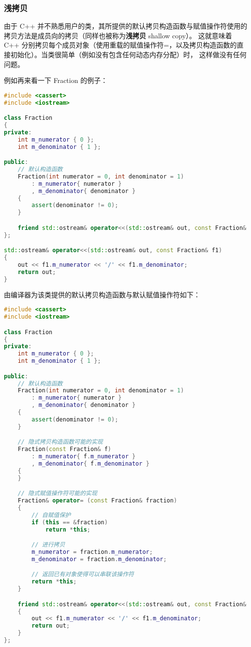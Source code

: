 \documentclass[../../LearnCpp.tex]{subfiles}
\begin{document}

\subsubsection*{浅拷贝}

由于 C++ 并不熟悉用户的类，其所提供的默认拷贝构造函数与赋值操作符使用的拷贝方法是成员向的拷贝（同样也被称为\textbf{浅拷贝} shallow copy）。
这就意味着 C++ 分别拷贝每个成员对象（使用重载的赋值操作符=，以及拷贝构造函数的直接初始化）。当类很简单（例如没有包含任何动态内存分配）时，
这样做没有任何问题。

例如再来看一下 Fraction 的例子：

\begin{lstlisting}[language=C++]
#include <cassert>
#include <iostream>

class Fraction
{
private:
    int m_numerator { 0 };
    int m_denominator { 1 };

public:
    // 默认构造函数
    Fraction(int numerator = 0, int denominator = 1)
        : m_numerator{ numerator }
        , m_denominator{ denominator }
    {
        assert(denominator != 0);
    }

    friend std::ostream& operator<<(std::ostream& out, const Fraction& f1);
};

std::ostream& operator<<(std::ostream& out, const Fraction& f1)
{
	out << f1.m_numerator << '/' << f1.m_denominator;
	return out;
}
\end{lstlisting}

由编译器为该类提供的默认拷贝构造函数与默认赋值操作符如下：

\begin{lstlisting}[language=C++]
#include <cassert>
#include <iostream>

class Fraction
{
private:
    int m_numerator { 0 };
    int m_denominator { 1 };

public:
    // 默认构造函数
    Fraction(int numerator = 0, int denominator = 1)
        : m_numerator{ numerator }
        , m_denominator{ denominator }
    {
        assert(denominator != 0);
    }

    // 隐式拷贝构造函数可能的实现
    Fraction(const Fraction& f)
        : m_numerator{ f.m_numerator }
        , m_denominator{ f.m_denominator }
    {
    }

    // 隐式赋值操作符可能的实现
    Fraction& operator= (const Fraction& fraction)
    {
        // 自赋值保护
        if (this == &fraction)
            return *this;

        // 进行拷贝
        m_numerator = fraction.m_numerator;
        m_denominator = fraction.m_denominator;

        // 返回已有对象使得可以串联该操作符
        return *this;
    }

    friend std::ostream& operator<<(std::ostream& out, const Fraction& f1)
    {
        out << f1.m_numerator << '/' << f1.m_denominator;
        return out;
    }
};
\end{lstlisting}
\end{document}
